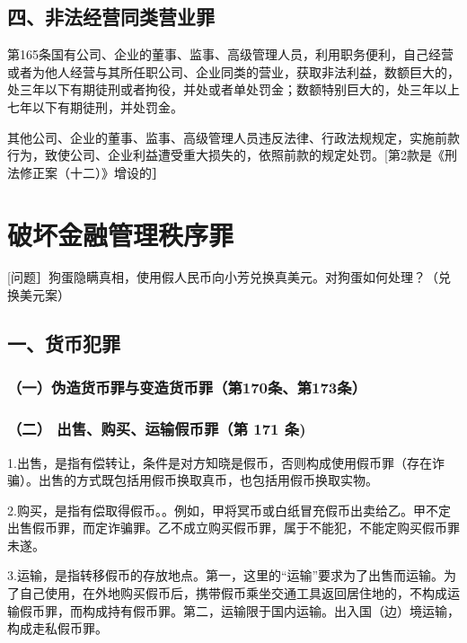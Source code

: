 \subsection*{四、非法经营同类营业罪}

第165条国有公司、企业的董事、监事、高级管理人员，利用职务便利，自己经营或者为他人经营与其所任职公司、企业同类的营业，获取非法利益，数额巨大的，处三年以下有期徒刑或者拘役，并处或者单处罚金；数额特别巨大的，处三年以上七年以下有期徒刑，并处罚金。

其他公司、企业的董事、监事、高级管理人员违反法律、行政法规规定，实施前款行为，致使公司、企业利益遭受重大损失的，依照前款的规定处罚。[第2款是《刑法修正案（十二）》增设的］

\section{破坏金融管理秩序罪}

[问题］狗蛋隐瞒真相，使用假人民币向小芳兑换真美元。对狗蛋如何处理？（兑换美元案）

\subsection*{一、货币犯罪}

\subsubsection*{（一）伪造货币罪与变造货币罪（第170条、第173条）}


\subsubsection*{（二） 出售、购买、运输假币罪（第 171 条)}

1.出售，是指有偿转让，条件是对方知晓是假币，否则构成使用假币罪（存在诈骗）。出售的方式既包括用假币换取真币，也包括用假币换取实物。

2.购买，是指有偿取得假币。。例如，甲将冥币或白纸冒充假币出卖给乙。甲不定出售假币罪，而定诈骗罪。乙不成立购买假币罪，属于不能犯，不能定购买假币罪未遂。

3.运输，是指转移假币的存放地点。第一，这里的“运输”要求为了出售而运输。为了自己使用，在外地购买假币后，携带假币乘坐交通工具返回居住地的，不构成运输假币罪，而构成持有假币罪。第二，运输限于国内运输。出入国（边）境运输，构成走私假币罪。

